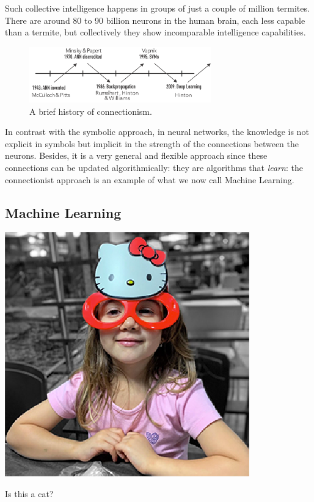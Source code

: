 \documentclass[
  letterpaper,
  12pt,
  british]{tufte-book}
\theoremstyle{plain}
\theoremstyle{definition}
\theoremstyle{plain}
\theoremstyle{remark}
\begin{document}
Such collective intelligence happens in groups of just a couple of
million termites. There are around 80 to 90 billion neurons in the human
brain, each less capable than a termite, but collectively they show
incomparable intelligence capabilities.

\begin{figure}

{\centering \includegraphics[width=0.7\textwidth,height=\textheight]{Images/winters.png}

}

\caption{A brief history of connectionism.}

\end{figure}

In contrast with the symbolic approach, in neural networks, the
knowledge is not explicit in symbols but implicit in the strength of the
connections between the neurons. Besides, it is a very general and
flexible approach since these connections can be updated
algorithmically: they are algorithms that \emph{learn}: the
connectionist approach is an example of what we now call Machine
Learning.

\hypertarget{machine-learning}{%
\subsection{Machine Learning}\label{machine-learning}}

\begin{marginfigure}

{\centering \includegraphics{Images/lulu.png}

}

\caption{\label{fig-lulu}Is this a cat?}

\end{marginfigure}
\end{document}
